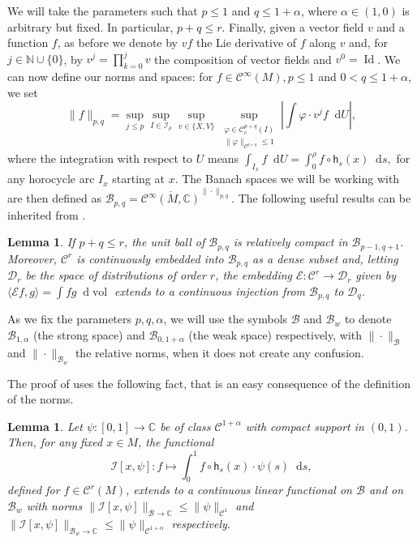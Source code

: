 \documentclass[11pt,letterpaper]{amsart}
\newcommand \cD {{\mathcal D}}
\newcommand \cI {{\mathcal I}}
\def\C{{\mathbb C}}
\newcommand \N {{ \mathbb N}}
\newcommand \cB {{\mathscr B}}
\newcommand \cC {{\mathscr{C}}}
\newcommand{\horo}{\mathsf{h}}
\newcommand*{\diff}{\mathop{}\!\mathrm{d}}
\DeclareMathOperator{\vol}{vol}
\newtheorem {lemma}[theorem]{Lemma}
\theoremstyle{definition}
\begin{document}
We will take the parameters such that $p \le 1$ and $q \le 1+\alpha$, where $\alpha \in(1,0)$ is arbitrary but fixed. In particular, $p+q \le r$. Finally, given a vector field $v$ and a function $f$, as before we denote by $v f$ the Lie derivative of $f$ along $v$ and, for $j\in \N\cup \{0\}$, by $v^j=\prod_{k=0}^j v$ the composition of vector fields and $v^0=\operatorname{Id}$. 
%
We can now define our norms and spaces: for $f\in \cC^\infty(M), p \le 1$ and $0 < q \leq 1+\alpha$, we set
\begin{equation}\label{eq:norm}
\|f\|_{p,q}=\sup_{j\le p}\sup_{I\in \cI_\rho} \sup_{v\in \{X,V\}}\sup_{\substack{\varphi \in \cC_c^{p+q}(I) \\ \|\varphi\|_{\cC^{p+q}}\le 1}}\left|\int \varphi \cdot   v^j f  \diff U\right|,
\end{equation}
where the integration with respect to $U$ means $
\int_{I_x} f \diff U= \int_{0}^\rho f\circ \horo_s(x) \diff s,
$ for any horocycle arc $I_x$ starting at $x$.
The Banach spaces we will be working with are then defined as $\cB_{p,q}= \overline{\cC^{\infty}(M, \C)}^{\|\cdot\|_{p,q}}$.
The following useful results can be inherited from \cite[Lemma 2.1, Proposition 4.1]{GoLi}.
\begin{lemma}\label{lem:useful}
If $p+q \le r$, the unit ball of $\cB_{p,q}$ is relatively compact in $\cB_{p-1,q+1}$. Moreover, $\cC^r$ is continuously embedded into $\cB_{p,q}$ as a dense subset and, letting $\cD_r$ be the space of distributions of order $r$, the embedding $\mathscr E: \cC^r\to \cD_r$ given by $\langle \mathscr E f, g \rangle=\int fg \diff \vol $ extends to a continuous injection from $\cB_{p,q}$ to $\cD_q$.
\end{lemma}
As we fix the parameters $p,q,\alpha$, we will use the symbols $\cB$ and $\cB_w$ to denote $\cB_{1,\alpha}$ (the strong space) and  $\cB_{0,1+\alpha}$ (the weak space) respectively, with $\|\cdot\|_{\cB}$ and $ \|\cdot\|_{\cB_w}$ the relative norms, when it does not create any confusion. 


The proof of  uses the following fact, that is an easy consequence of the definition of the norms.
\begin{lemma}\label{lem:integral_is_cont_funct}
	Let $\psi \colon [0,1] \to \C$ be of class $\mathscr{C}^{1+\alpha}$ with compact support in $(0,1)$. Then, for any fixed $x \in M$, the functional 
	\[
	\mathcal{I}[x,\psi] \colon f \mapsto \int_0^1 f \circ \horo_s(x) \cdot \psi(s) \diff  s,
	\]
	\sloppy defined for $f \in \mathscr{C}^r(M)$, extends to a continuous linear functional on $\cB$ and on $\cB_w$ with norms $\| \mathcal{I}[x,\psi] \|_{\cB \to \C} \leq \|\psi\|_{\mathscr{C}^{1}}$ and $\| \mathcal{I}[x,\psi] \|_{\cB_w \to \C} \leq \|\psi\|_{\mathscr{C}^{1+\alpha}}$ respectively.
\end{lemma}
\end{document}
